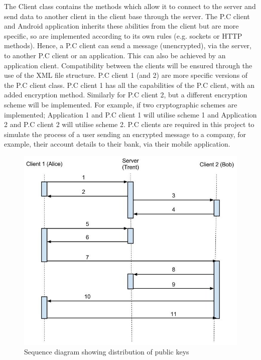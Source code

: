 \documentclass[a4paper,11pt]{article}
\begin{document}
The Client class contains the methods which allow it to connect to the server and send data to another client in the client base through the server. The P.C client and Android application inherits these abilities from the client but are more specific, so are implemented according to its own rules (e.g. sockets or HTTP methods). Hence, a P.C client can send a message (unencrypted), via the server, to another P.C client or an application. This can also be achieved by an application client. Compatibility between the clients will be ensured through the use of the XML file structure. P.C client 1 (and 2) are more specific versions of the P.C client class. P.C client 1 has all the capabilities of the P.C client, with an added encryption method. Similarly for P.C client 2, but a different encryption scheme will be implemented. For example, if two cryptographic schemes are implemented; Application 1 and P.C client 1 will utilise scheme 1 and Application 2 and P.C client 2 will utilise scheme 2. P.C clients are required in this project to simulate the process of a user sending an encrypted message to a company, for example, their account details to their bank, via their mobile application. 

\begin{figure}[htb]
\centering
\includegraphics[scale=0.35]{designs3.jpg}
\caption{Sequence diagram showing distribution of public keys}
\label{fig:designs3}
\end{figure}
\end{document}
